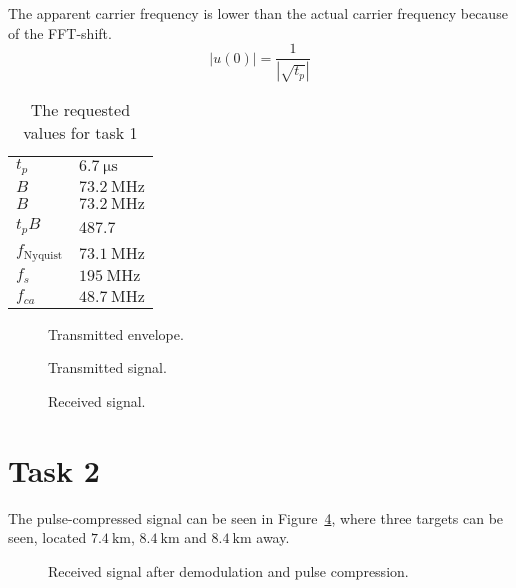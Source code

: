 \documentclass[12pt,a4paper]{article}
\begin{document}
The apparent carrier frequency is lower than the actual carrier frequency because of the FFT-shift.
\begin{equation}
  \label{eq:pulse_width}
  |u(0)|=\frac{1}{|\sqrt{t_p}|}
\end{equation}
\begin{table}[h]
  \centering
  \begin{tabular}{|l|l|}\hline
    $t_p$ & $\SI{6.7}{\micro\second}$ \\
    $B$ & $\SI{73.2}{\mega\hertz}$ \\
    $B$ & $\SI{73.2}{\mega\hertz}$ \\
    $t_pB$ & 487.7 \\
    $f_\text{Nyquist}$ & $\SI{73.1}{\mega\hertz}$ \\
    $f_s$ & $\SI{195}{\mega\hertz}$ \\
    $f_{ca}$ & $\SI{48.7}{\mega\hertz}$ \\ \hline
  \end{tabular}
  \caption{The requested values for task 1}
  \label{tab:task1}
\end{table}
\begin{figure}[h]
  \centering
  \noindent\makebox[\textwidth]{\scalebox{0.90}{}}
  \caption{Transmitted envelope.}
  \label{fig:task1_ut}
\end{figure}
\begin{figure}[h]
  \centering
  \noindent\makebox[\textwidth]{\scalebox{0.90}{}}
  \caption{Transmitted signal.}
  \label{fig:task1_st}
\end{figure}
\begin{figure}[h]
  \centering
  \noindent\makebox[\textwidth]{\scalebox{0.90}{}}
  \caption{Received signal.}
  \label{fig:task1_sr}
\end{figure}

\section{Task 2}\label{sec:2}
The pulse-compressed signal can be seen in Figure~\ref{fig:task2}, where three targets can be seen, located $\SI{7.4}{\kilo\meter}$, $\SI{8.4}{\kilo\meter}$ and $\SI{8.4}{\kilo\meter}$ away.
\begin{figure}[h]
  \centering
  \noindent\makebox[\textwidth]{\scalebox{0.90}{}}
  \caption{Received signal after demodulation and pulse compression.}
  \label{fig:task2}
\end{figure}
\end{document}
